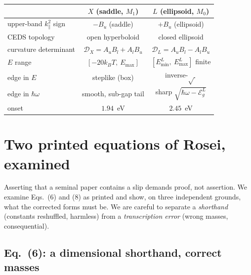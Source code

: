 \documentclass[11pt]{article}
\newcommand{\kpar}{k_{\parallel}}
\newcommand{\hw}{\hbar\omega}
\newcommand{\EgL}{\mathcal{E}_{g}^{L}}
\newcommand{\Dc}{\mathcal{D}}
\newcommand{\Rq}[1]{\textcolor{roseicol}{\textnormal{(#1)}}}
\begin{document}
\begin{center}\small
\renewcommand{\arraystretch}{1.25}
\begin{tabular}{@{}l c c@{}}
\toprule
 & \textbf{\textcolor{workcol}{$X$ (saddle, $M_1$)}} & \textbf{\textcolor{roseicol}{$L$ (ellipsoid, $M_0$)}}\\
\midrule
upper-band $\kpar^2$ sign      & $-B_u$ (saddle)        & $+B_u$ (ellipsoid)\\
CEDS topology                  & open hyperboloid       & closed ellipsoid\\
curvature determinant          & $\Dc_X=A_uB_l+A_lB_u$  & $\Dc_L=A_uB_l-A_lB_u$\\
$E$ range                      & $[-20k_BT,\ E_{\max}]$  & $[E_{\min}^L,\ E_{\max}^L]$ finite\\
edge in $E$                    & steplike (box)         & inverse-$\sqrt{\ }$\\
edge in $\hbar\omega$          & smooth, sub-gap tail   & sharp $\sqrt{\hw-\EgL}$\\
onset                          & $1.94$~eV              & $2.45$~eV\\
\bottomrule
\end{tabular}
\end{center}

\section{Two printed equations of Rosei, examined}
\label{sec:printed}

Asserting that a seminal paper contains a slip demands proof, not assertion. We examine
Eqs.~\Rq{6} and \Rq{8} as printed and show, on three independent grounds, what the
corrected forms must be. We are careful to separate a \emph{shorthand} (constants
reshuffled, harmless) from a \emph{transcription error} (wrong masses, consequential).

\subsection{Eq.~\Rq{6}: a dimensional shorthand, correct masses}
\end{document}
